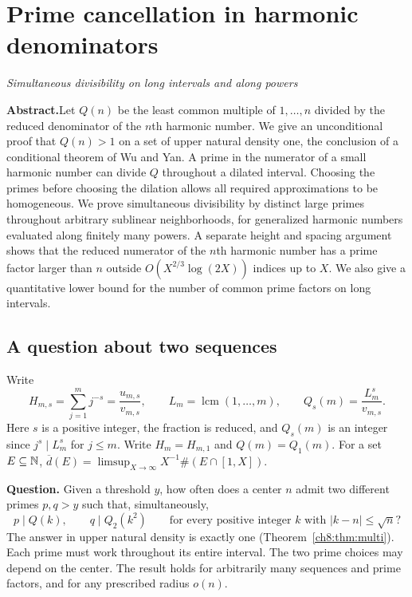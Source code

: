 \documentclass[11pt,a4paper,oneside,openany]{report}
\theoremstyle{remark}\newtheorem{remark}[theorem]{Remark}
\numberwithin{equation}{section}
\newcommand{\dens}{\overline d}\newcommand{\lcm}{\operatorname{lcm}}
\newcommand{\card}{\#}\newcommand{\vol}{\operatorname{meas}}
\begin{document}
\chapter[Prime cancellation in harmonic denominators]{Prime cancellation in harmonic denominators}\label{chap:8}
{\noindent\large\itshape Simultaneous divisibility on long intervals and along powers\par}\vspace{9pt}
\noindent\textbf{Abstract.}\enspace Let $Q(n)$ be the least common multiple of $1,\ldots,n$ divided by the reduced denominator of the $n$th harmonic number. We give an unconditional proof that $Q(n)>1$ on a set of upper natural density one, the conclusion of a conditional theorem of Wu and Yan. A prime in the numerator of a small harmonic number can divide $Q$ throughout a dilated interval. Choosing the primes before choosing the dilation allows all required approximations to be homogeneous. We prove simultaneous divisibility by distinct large primes throughout arbitrary sublinear neighborhoods, for generalized harmonic numbers evaluated along finitely many powers. A separate height and spacing argument shows that the reduced numerator of the $n$th harmonic number has a prime factor larger than $n$ outside $O(X^{2/3}\log(2X))$ indices up to $X$. We also give a quantitative lower bound for the number of common prime factors on long intervals.

\section{A question about two sequences}
Write
\[
 H_{m,s}=\sum_{j=1}^m j^{-s}=\frac{u_{m,s}}{v_{m,s}},\qquad
 L_m=\lcm(1,\ldots,m),\qquad Q_s(m)=\frac{L_m^s}{v_{m,s}}.
\]
Here $s$ is a positive integer, the fraction is reduced, and $Q_s(m)$ is an integer since $j^s\mid L_m^s$ for $j\le m$. Write $H_m=H_{m,1}$ and $Q(m)=Q_1(m)$.
For a set $E\subseteq\mathbb N$, $\dens(E)=\limsup_{X\to\infty}X^{-1}\card(E\cap[1,X])$.

\smallskip\noindent\textbf{Question.} Given a threshold $y$, how often does a center $n$ admit two different primes $p,q>y$ such that, simultaneously,
\[
 p\mid Q(k),\qquad q\mid Q_2(k^2)
 \qquad\text{for every positive integer } k \text{ with } |k-n|\le\sqrt n?
\]
The answer in upper natural density is exactly one (Theorem~\ref{ch8:thm:multi}). Each prime must work throughout its entire interval. The two prime choices may depend on the center. The result holds for arbitrarily many sequences and prime factors, and for any prescribed radius $o(n)$.
\end{document}
